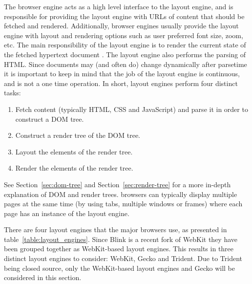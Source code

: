 \documentclass[a4paper,11pt]{kth-mag}
\begin{document}
        The \gls{browser} engine acts as a high level interface to the \gls{layout engine}, and is responsible for providing the \gls{layout engine} with \glspl{URL} of content that should be fetched and rendered.
        Additionally, browser engines usually provide the layout engine with layout and rendering options such as user preferred font size, zoom, etc.
        The main responsibility of the \gls{layout engine} is to render the current state of the fetched \gls{hypertext} \gls{document} \cite{garsiel2011browsers}.
        The \gls{layout engine} also performs the parsing of \gls{HTML}.
        Since \glspl{document} may (and often do) change dynamically after parsetime it is important to keep in mind that the job of the \gls{layout engine} is continuous, and is not a one time operation.
        In short, \glspl{layout engine} perform four distinct tasks:
        \begin{enumerate}
          \item Fetch content (typically \gls{HTML}, \gls{CSS} and \gls{JavaScript}) and parse it in order to construct a \gls{DOM} tree. 
          \item Construct a \gls{render tree} of the \gls{DOM} tree.
          \item Layout the \glspl{element} of the \gls{render tree}.
          \item Render the \glspl{element} of the \gls{render tree}.
        \end{enumerate}
        See Section~\ref{sec:dom-tree} and Section~\ref{sec:render-tree} for a more in-depth explanation of \gls{DOM} and \glspl{render tree}.
        \Glspl{browser} can typically display multiple pages at the same time (by using tabs, multiple windows or frames) where each page has an instance of the \gls{layout engine}.

        There are four \glspl{layout engine} that the major \glspl{browser} use, as presented in table~\ref{table:layout_engines}.
        Since Blink is a recent \gls{fork} of \gls{WebKit} they have been grouped together as \gls{WebKit}-based \glspl{layout engine}.
        This results in three distinct \glspl{layout engine} to consider: \gls{WebKit}, Gecko and Trident.
        Due to Trident being closed source, only the \gls{WebKit}-based \glspl{layout engine} and Gecko will be considered in this section.
\end{document}
